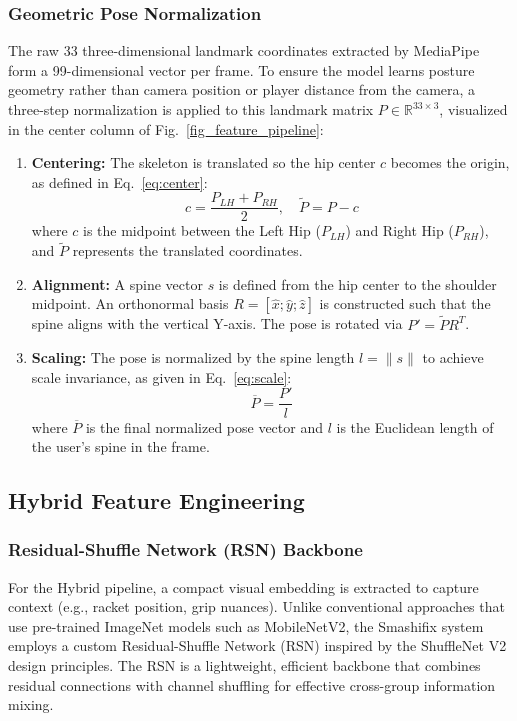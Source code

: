\documentclass[pdflatex,sn-mathphys-num]{sn-jnl}
\theoremstyle{thmstyleone}%
\theoremstyle{thmstyletwo}%
\theoremstyle{thmstylethree}%
\begin{document}
\subsubsection{Geometric Pose Normalization}
The raw 33 three-dimensional landmark coordinates extracted by MediaPipe form a 99-dimensional vector per frame. To ensure the model learns posture geometry rather than camera position or player distance from the camera, a three-step normalization is applied to this landmark matrix $P \in \mathbb{R}^{33\times3}$, visualized in the center column of Fig.~\ref{fig_feature_pipeline}:
\begin{enumerate}
    \item \textbf{Centering:} The skeleton is translated so the hip center $c$ becomes the origin, as defined in Eq.~\eqref{eq:center}:
    \begin{equation}
    c = \frac{P_{LH} + P_{RH}}{2}, \quad \tilde{P} = P - c
    \label{eq:center}
    \end{equation}
    \noindent where $c$ is the midpoint between the Left Hip ($P_{LH}$) and Right Hip ($P_{RH}$), and $\tilde{P}$ represents the translated coordinates.
    
    \item \textbf{Alignment:} A spine vector $s$ is defined from the hip center to the shoulder midpoint. An orthonormal basis $R = [\hat{x}; \hat{y}; \hat{z}]$ is constructed such that the spine aligns with the vertical Y-axis. The pose is rotated via $P' = \tilde{P}R^T$.
    
    \item \textbf{Scaling:} The pose is normalized by the spine length $l = \|s\|$ to achieve scale invariance, as given in Eq.~\eqref{eq:scale}:
    \begin{equation}
    \overline{P} = \frac{P'}{l}
    \label{eq:scale}
    \end{equation}
    \noindent where $\overline{P}$ is the final normalized pose vector and $l$ is the Euclidean length of the user's spine in the frame.
\end{enumerate}
\clearpage
\subsection{Hybrid Feature Engineering}

\subsubsection{Residual-Shuffle Network (RSN) Backbone}
For the Hybrid pipeline, a compact visual embedding is extracted to capture context (e.g., racket position, grip nuances). Unlike conventional approaches that use pre-trained ImageNet models such as MobileNetV2, the Smashifix system employs a custom Residual-Shuffle Network (RSN) inspired by the ShuffleNet V2 \cite{b24} design principles. The RSN is a lightweight, efficient backbone that combines residual connections with channel shuffling for effective cross-group information mixing.
\end{document}
